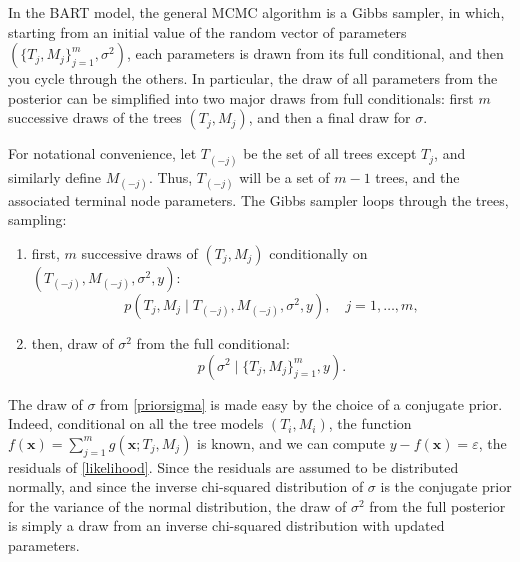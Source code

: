 \documentclass[a4paper,11pt]{article}
\begin{document}
In the BART model, the general MCMC algorithm is a Gibbs sampler, in which, starting from an initial value of the random vector of parameters $ (\{T_j, M_j\}_{j=1}^m, \sigma^2) $, each parameters is drawn from its full conditional, and then you cycle through the others. In particular, the draw of all parameters from the posterior can be simplified into two major draws from full conditionals: first $m$ successive draws of the trees $(T_j,M_j)$, and then a final draw for $\sigma$.

For notational convenience, let \( T_{(-j)} \) be the set of all trees except \( T_j \), and similarly define \( M_{(-j)} \). Thus, \( T_{(-j)} \) will be a set of \( m - 1 \) trees, and the associated terminal node parameters. 
The Gibbs sampler loops through the trees, sampling:
\begin{enumerate}
    \item  first,  \( m \) successive draws of \( (T_j, M_j) \) conditionally on \( (T_{(-j)}, M_{(-j)}, \sigma^2, y) \):
\begin{equation}
p(T_j, M_j \mid T_{(-j)}, M_{(-j)}, \sigma^2, y), \quad j = 1, \ldots, m, \label{priortree}
\end{equation}
\item then,  draw of \( \sigma^2 \) from the full conditional:
\begin{equation}
p\left(\sigma^2 \mid\{T_j, M_j\}_{j=1}^m, y\right). \label{priorsigma}
\end{equation}
\end{enumerate}
The draw of $\sigma$ from \eqref{priorsigma} is made easy by the choice of a conjugate prior. Indeed, conditional on all the tree models $(T_i, M_i)$, the function $f(\mathbf{x})=\sum_{j=1}^m g(\mathbf{x}; T_j, M_j) $ is known, and we can compute $y - f(\mathbf{x}) = \varepsilon $, the residuals of \eqref{likelihood}. Since the residuals are assumed to be distributed normally, and since the inverse chi-squared distribution of $\sigma$ is the conjugate prior for the variance of the normal distribution, the draw of \( \sigma^2 \) from the full posterior is simply a draw from an inverse chi-squared distribution with updated parameters. 
\end{document}
